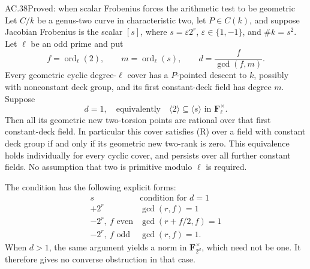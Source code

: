 \begin{claim}{AC.38}{Proved: when scalar Frobenius forces the arithmetic test to be geometric}
Let \(C/k\) be a genus-two curve in characteristic two,
let \(P\in C(k)\), and suppose Jacobian Frobenius is the
scalar \([s]\), where \(s=\varepsilon2^r\),
\(\varepsilon\in\{1,-1\}\), and \(\#k=s^2\).
Let \(\ell\) be an odd prime and put
\[
 f=\operatorname{ord}_\ell(2),\qquad
 m=\operatorname{ord}_\ell(s),\qquad
 d=\frac{f}{\gcd(f,m)}.
\]
Every geometric cyclic degree-\(\ell\) cover has a
\(P\)-pointed descent to \(k\), possibly with nonconstant
deck group, and its first constant-deck field has degree
\(m\). Suppose
\[
                  d=1,
        \quad\text{equivalently}\quad
          \langle2\rangle\subseteq\langle s\rangle
                         \text{ in }\mathbf F_\ell^\times.
\]
Then all its geometric new two-torsion points are rational over
that first constant-deck field. In particular this
cover satisfies (R) over a field with constant deck
group if and only if its geometric new two-rank is zero.
This equivalence holds individually for every cyclic
cover, and persists over all further constant fields.
No assumption that two is primitive modulo \(\ell\)
is required.

The condition has the following explicit forms:
\[
\begin{array}{c|c}
 s&\text{condition for }d=1\\ \hline
 +2^r&\gcd(r,f)=1\\
 -2^r,\ f\text{ even}&\gcd(r+f/2,f)=1\\
 -2^r,\ f\text{ odd}&\gcd(r,f)=1.
\end{array}
\]
When \(d>1\), the same argument yields a norm in
\(\mathbf F_{2^d}^\times\), which need not be one.
It therefore gives no converse obstruction in that case.
\end{claim}
